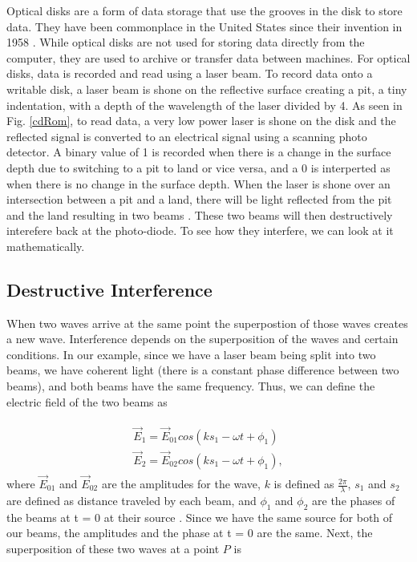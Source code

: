 \documentclass[ notitlepage, numerical, 11pt]{revtex4-1} %
\begin{document}
Optical disks are a form of data storage that use the grooves in the disk to store data. They have been commonplace in the United States since their invention in 1958 \cite{memory}. While optical disks are not used for storing data directly from the computer, they are used to archive or transfer data between machines. For optical disks, data is recorded and read using a laser beam. To record data onto a writable disk, a laser beam is shone on the reflective surface creating a pit, a tiny indentation, with a depth of the wavelength of the laser divided by 4. As seen in Fig. \ref{cdRom}, to read data, a very low power laser is shone on the disk and the reflected signal is converted to an electrical signal using a scanning photo detector. A binary value of 1 is recorded when there is a change in the surface depth due to switching to a pit to land or vice versa, and a 0 is interperted as when there is no change in the surface depth. When the laser is shone over an intersection between a pit and a land, there will be light reflected from the pit and the land resulting in two beams \cite{memory}. These two beams will then destructively interefere back at the photo-diode. To see how they interfere, we can look at it mathematically. 


\subsection{Destructive Interference}
When two waves arrive at the same point the superpostion of those waves creates a new wave. Interference depends on the superposition of the waves and certain conditions. In our example, since we have a laser beam being split into two beams, we have coherent light (there is a constant phase difference between two beams), and both beams have the same frequency. Thus, we can define the electric field of the two beams as


\begin{align}
\begin{split}
\vec{E}_{1} = \vec{E}_{01} cos(k s_1-\omega t + \phi_1) \\
\vec{E}_{2} = \vec{E}_{02} cos(k s_1-\omega t + \phi_1),
\end{split}
\label{eRefInf}
\end{align}
where $ \vec{E}_{01}$ and $ \vec{E}_{02}$ are the amplitudes for the wave, $k$ is defined as $\frac{2\pi}{\lambda}$, $s_1$ and $s_2$ are defined as distance traveled by each beam, and $\phi_1$ and $\phi_2$ are the phases of the beams at t = 0 at their source \cite{optics}. Since we have the same source for both of our beams, the amplitudes and the phase at t = 0 are the same. Next, the superposition of these two waves at a point $P$ is 
\end{document}
